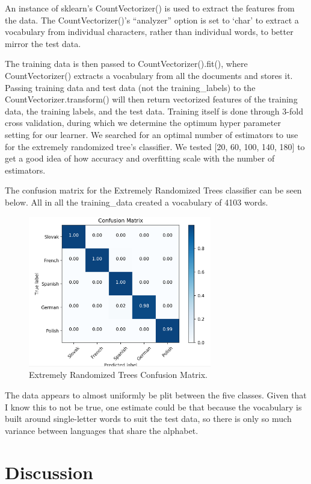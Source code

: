 \documentclass[conference]{IEEEtran}
\begin{document}
An instance of sklearn’s CountVectorizer() is used to extract the features from the data. The CountVectorizer()’s “analyzer” option is set to ‘char’ to extract a vocabulary from individual characters, rather than individual words, to better mirror the test data.

The training data is then passed to CountVectorizer().fit(), where CountVectorizer() extracts a vocabulary from all the documents and stores it. Passing training data and test data (not the training_labels) to the CountVectorizer.transform() will then return vectorized features of the training data, the training labels, and the test data.
Training itself is done through 3-fold cross validation, during which we determine the optimum hyper parameter setting for our learner. We searched for an optimal number of estimators to use for the extremely randomized tree’s classifier. We tested [20, 60, 100, 140, 180] to get a good idea of how accuracy and overfitting scale with the number of estimators.

The confusion matrix for the Extremely Randomized Trees classifier can be seen below. All in all the training_data created a vocabulary of 4103 words. 

\begin{figure}[htbp]
\centering
\includegraphics[width=80mm]{confusion_ert.png}
\caption{Extremely Randomized Trees Confusion Matrix.}
\label{confusion_extremely_randomized_trees}
\end{figure}

The data appears to almost uniformly be plit between the five classes. Given that I know this to not be true, one estimate could be that because the vocabulary is built around single-letter words to suit the test data, so there is only so much variance between languages that share the alphabet. 


\section{Discussion}
\end{document}
